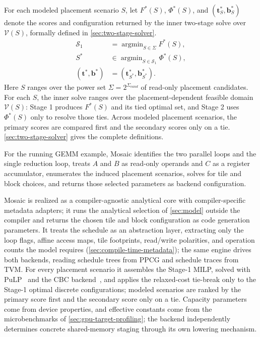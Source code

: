 \documentclass[acmsmall,review,anonymous,screen]{acmart}
\newcommand{\name}{{Mosaic}\xspace}
\newcommand{\tvec}{\mathbf{t}}
\begin{document}
For each modeled placement scenario \(S\), let \(F^*(S)\), \(\Phi^*(S)\), and \((\tvec_S^*,\mathbf{b}_S^*)\) denote the scores and configuration returned by the inner two-stage solve over \(\mathcal{V}(S)\), formally defined in \autoref{sec:two-stage-solver}.
\begin{equation}
\begin{aligned}
\mathcal{S}_1
&=\mathop{\arg\min}_{S\in\Sigma} F^*(S),\\
S^*
&\in \mathop{\arg\min}_{S\in\mathcal{S}_1} \Phi^*(S),\\
(\tvec^*,\mathbf{b}^*)
&=(\tvec_{S^*}^*,\mathbf{b}_{S^*}^*).
\end{aligned}
\label{eq:two-level}
\end{equation}
Here \(S\) ranges over the power set \(\Sigma=2^{\Sigma_{\mathit{cand}}}\) of read-only placement candidates. For each \(S\), the inner solve ranges over the placement-dependent feasible domain \(\mathcal{V}(S)\): Stage 1 produces \(F^*(S)\) and its tied optimal set, and Stage 2 uses \(\Phi^*(S)\) only to resolve those ties. Across modeled placement scenarios, the primary scores are compared first and the secondary scores only on a tie. \autoref{sec:two-stage-solver} gives the complete definitions. %

For the running GEMM example, \name identifies the two parallel loops and the single reduction loop, treats \(A\) and \(B\) as read-only operands and \(C\) as a register accumulator, enumerates the induced placement scenarios, solves for tile and block choices, and returns those selected parameters as backend configuration.

\name is realized as a compiler-agnostic analytical core with compiler-specific metadata adapters; it runs the analytical selection of \autoref{sec:model} outside the compiler and returns the chosen tile and block configuration as code generation parameters. It treats the schedule as an abstraction layer, extracting only the loop flags, affine access maps, tile footprints, read/write polarities, and operation counts the model requires (\autoref{sec:compile-time-metadata}); the same engine drives both backends, reading schedule trees from PPCG and schedule traces from TVM. For every placement scenario it assembles the Stage-1 MILP, solved with PuLP~\cite{pulp} and the CBC backend~\cite{cbc}, and applies the relaxed-cost tie-break only to the Stage-1 optimal discrete configurations; modeled scenarios are ranked by the primary score first and the secondary score only on a tie. Capacity parameters come from device properties, and effective constants come from the microbenchmarks of \autoref{sec:gpu-target-profiling}; the backend independently determines concrete shared-memory staging through its own lowering mechanism.
\end{document}
